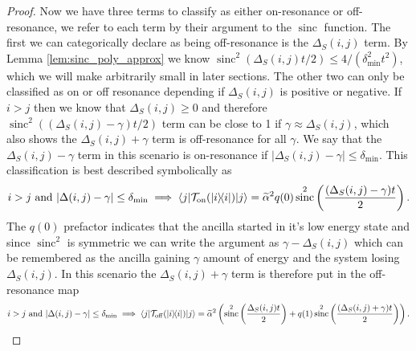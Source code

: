 \documentclass{article}
\newcommand{\on}{\rm on}
\newcommand{\off}{\rm off}
\newcommand{\ket}[1]{|#1\rangle}
\newcommand{\bra}[1]{\langle #1|}
\newcommand{\ketbra}[2]{| #1\rangle\! \langle #2|}
\DeclareMathOperator{\sinc}{sinc}
\begin{document}
\begin{proof}
    
    Now we have three terms to classify as either on-resonance or off-resonance, we refer to each term by their argument to the $\sinc$ function. The first we can categorically declare as being off-resonance is the $\Delta_S(i,j)$ term. By Lemma \ref{lem:sinc_poly_approx} we know $\sinc^2(\Delta_S(i,j) t/ 2) \le 4 / (\delta_{\min}^2 t^2)$, which we will make arbitrarily small in later sections. The other two can only be classified as on or off resonance depending if $\Delta_S(i,j)$ is positive or negative. If $i > j$ then we know that $\Delta_S(i,j) \ge 0$ and therefore $\sinc^2((\Delta_S(i,j) - \gamma)t/2)$ term can be close to 1 if $\gamma \approx \Delta_{S}(i,j)$, which also shows the $\Delta_S(i,j) + \gamma$ term is off-resonance for all $\gamma$. We say that the $\Delta_S(i,j) - \gamma$ term in this scenario is on-resonance if $|\Delta_S(i,j) - \gamma| \le \delta_{\min}$. This classification is best described symbolically as
    \begin{equation}
    i > j \text{ and } |\Delta(i,j) - \gamma| \le \delta_{\min} \implies  \bra{j} \mathcal{T}_{\on}(\ketbra{i}{i}) \ket{j} = \widetilde{\alpha}^2 q(0) \sinc^2 \left( \frac{(\Delta_S(i,j) - \gamma)t}{2} \right).\label{eq:on_resonance_i_geq_j}
    \end{equation}
    The $q(0)$ prefactor indicates that the ancilla started in it's low energy state and since $\sinc^2$ is symmetric we can write the argument as $\gamma - \Delta_S(i,j)$ which can be remembered as the ancilla gaining $\gamma$ amount of energy and the system losing $\Delta_S(i,j)$. In this scenario the $\Delta_S(i,j) + \gamma$ term is therefore put in the off-resonance map
    \begin{align}
        i > j \text{ and } |\Delta(i,j) - \gamma| \le \delta_{\min} \implies  \bra{j} \mathcal{T}_{\off}(\ketbra{i}{i}) \ket{j} = \widetilde{\alpha}^2\left( \sinc^2 \left( \frac{\Delta_S(i,j) t}{2} \right) + q(1) \sinc^2 \left(\frac{(\Delta_S(i,j) + \gamma) t}{2} \right) \right).
    \end{align}
    

\end{proof}
\end{document}
